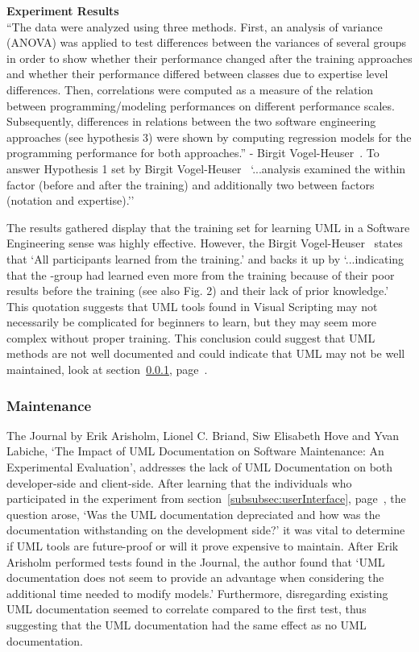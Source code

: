 \documentclass[conference]{IEEEtran}
\begin{document}
          \textbf{Experiment Results}\\
            ``The data were analyzed using three methods. First, an analysis of variance (ANOVA) was applied to test differences between the variances of several groups in order to show whether their performance changed after the training approaches and whether their performance differed between classes due to expertise level differences. Then, correlations were computed as a measure of the relation between programming/modeling performances on different performance scales. Subsequently, differences in relations between the two software engineering approaches (see hypothesis 3) were shown by computing regression models for the programming performance for both approaches.'' - Birgit Vogel-Heuser~\cite{vogel-heuser_evaluation_2013}. To answer Hypothesis 1 set by Birgit Vogel-Heuser~\cite{vogel-heuser_evaluation_2013} `...analysis examined the within factor (before and after the training) and additionally two between factors (notation and expertise).''

            The results gathered display that the training set for learning UML in a Software Engineering sense was highly effective. However, the Birgit Vogel-Heuser~\cite{vogel-heuser_evaluation_2013} states that `All participants learned from the training.' and backs it up by `...indicating that the -group had learned even more from the training because of their poor results before the training (see also Fig. 2) and their lack of prior knowledge.' This quotation suggests that UML tools found in Visual Scripting may not necessarily be complicated for beginners to learn, but they may seem more complex without proper training. This conclusion could suggest that UML methods are not well documented and could indicate that UML may not be well maintained, look at section~\ref{subsubsec:maintenance}, page~\pageref{subsubsec:maintenance}.

        \subsubsection{Maintenance}
        \label{subsubsec:maintenance}
        The Journal by Erik Arisholm, Lionel C. Briand, Siw Elisabeth Hove and Yvan Labiche, `The Impact of UML Documentation on Software Maintenance: An Experimental Evaluation', addresses the lack of UML Documentation on both developer-side and client-side. After learning that the individuals who participated in the experiment from section~\ref{subsubsec:userInterface}, page~\pageref{subsubsec:userInterface}, the question arose, `Was the UML documentation depreciated and how was the documentation withstanding on the development side?' it was vital to determine if UML tools are future-proof or will it prove expensive to maintain. After Erik Arisholm performed tests found in the Journal, the author found that `UML documentation does not seem to provide an advantage when considering the additional time needed to modify models.' Furthermore, disregarding existing UML documentation seemed to correlate compared to the first test, thus suggesting that the UML documentation had the same effect as no UML documentation.
\end{document}
